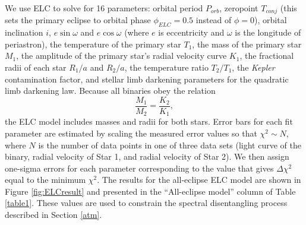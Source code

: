 We use ELC to solve for 16 parameters: orbital period $P_{orb}$, zeropoint $T_{conj}$ (this sets the primary eclipse to orbital phase $\phi_{ELC} = 0.5$ instead of $\phi = 0$), orbital inclination $i$, $e \sin \omega$ and $e \cos \omega$ (where $e$ is eccentricity and $\omega$ is the longitude of periastron), the temperature of the primary star $T_1$, the mass of the primary star $M_1$, the amplitude of the primary star's radial velocity curve $K_1$, the fractional radii of each star $R_1/a$ and $R_2/a$, the temperature ratio $T_2/T_1$, the \emph{Kepler} contamination factor, and stellar limb darkening parameters for the quadratic limb darkening law. Because all binaries obey the relation
\begin{equation}
\frac{M_1}{M_2} = \frac{K_2}{K_1},
\end{equation}
the ELC model includes masses and radii for both stars. Error bars for each fit parameter are estimated by scaling the measured error values so that $\chi^2 \sim N$, where $N$ is the number of data points in one of three data sets (light curve of the binary, radial velocity of Star 1, and radial velocity of Star 2). We then assign one-sigma errors for each parameter corresponding to the value that gives $\Delta \chi^2$ equal to the minimum $\chi^2$. The results for the all-eclipse ELC model are shown in Figure \ref{fig:ELCresult} and presented in the ``All-eclipse model'' column of Table \ref{table1}. These values are used to constrain the spectral disentangling process described in Section \ref{atm}.

  
  
  
  
  
  